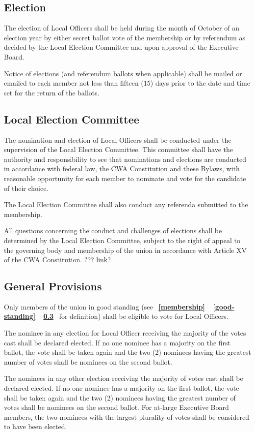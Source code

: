 \documentclass[11pt]{article}
\newcommand{\fullref}[3]{%
  \mbox{\textbf{%
    \ifthenelse{\isempty{#1}}%
    {}%
    {\ref{#1}}%
    \ifthenelse{\isempty{#2}}%
    {}%
    {%
      \ifthenelse{\isempty{#1}}{}{, }%
      \ref{#2}%
    }%
    \ifthenelse{\isempty{#3}}%
    {}%
    {\ref{#3}}%
  }}%
}
\begin{document}
\subsection{Election}
The election of Local Officers shall be held during the month of October of an election year by either secret ballot vote of the membership or by referendum as decided by the Local Election Committee and upon approval of the Executive Board.

Notice of elections (and referendum ballots when applicable) shall be mailed or emailed to each member not less than fifteen (15) days prior to the date and time set for the return of the ballots.

\subsection{Local Election Committee}
The nomination and election of Local Officers shall be conducted under the supervision of the Local Election Committee. This committee shall have the authority and responsibility to see that nominations and elections are conducted in accordance with federal law, the CWA Constitution and these Bylaws, with reasonable opportunity for each member to nominate and vote for the candidate of their choice.

The Local Election Committee shall also conduct any referenda submitted to the membership.

All questions concerning the conduct and challenges of elections shall be determined by the Local Election Committee, subject to the right of appeal to the governing body and membership of the union in accordance with Article XV of the CWA Constitution. ??? link?

\subsection{General Provisions}
Only members of the union in good standing (see \fullref{membership}{good-standing}{} for definition) shall be eligible to vote for Local Officers.

The nominee in any election for Local Officer receiving the majority of the votes cast shall be declared elected. If no one nominee has a majority on the first ballot, the vote shall be taken again and the two (2) nominees having the greatest number of votes shall be nominees on the second ballot.

The nominees in any other election receiving the majority of votes cast shall be declared elected. If no one nominee has a majority on the first ballot, the vote shall be taken again and the two (2) nominees having the greatest number of votes shall be nominees on the second ballot. For at-large Executive Board members, the two nominees with the largest plurality of votes shall be considered to have been elected.
\end{document}

